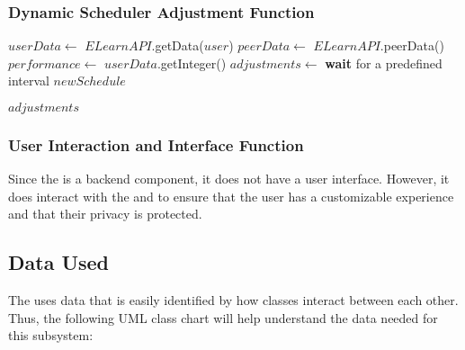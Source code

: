 \documentclass[12pt]{article}
\begin{document}
\subsubsection{Dynamic Scheduler Adjustment Function}
\begin{algorithmic}[1] %
    \State $userData \gets$ $ELearnAPI$.getData($user$)
    \State $peerData \gets$ $ELearnAPI$.peerData()
        \State $performance \gets$ $userData$.getInteger()
        \State $adjustments \gets$ 
        \State {}
        \State {}
        \State \textbf{wait} for a predefined interval
    \EndWhile
    \State \Return $newSchedule$
\EndFunction
\Statex

    \State {}
    \State {}
    \State \Return $adjustments$
\EndFunction
\Statex

    \State {}
\EndFunction
\Statex

    \State {}
\EndFunction

\end{algorithmic}

\subsubsection{User Interaction and Interface Function}
Since the \subsystem is a backend component, it does not have a user interface. However, it does interact with the \userSubsystem and \securitySubsystem to ensure that the user has a customizable experience and that their privacy is protected.

\newpage
\subsection{Data Used}
The \subsystem uses data that is easily identified by how classes interact between each other. Thus, the following UML class chart will help understand the data needed for this subsystem:
\\
\end{document}
